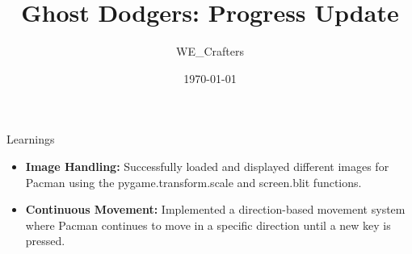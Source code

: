 \documentclass{beamer}
\title{Ghost Dodgers: Progress Update}
\author{WE\_Crafters}
\date{\today}
\begin{document}
\begin{frame}
  \titlepage
\end{frame}

\begin{frame}{Learnings}
	\begin{itemize}
		\item \textbf{Image Handling:} Successfully loaded and displayed different images for Pacman using the pygame.transform.scale and screen.blit functions.
		\item \textbf{Continuous Movement:} Implemented a direction-based movement system where Pacman continues to move in a specific direction until a new key is pressed.
	\end{itemize}
\end{frame}
\end{document}
